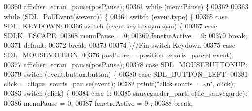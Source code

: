 \begin{DoxyCode}
00360                         afficher\_ecran\_pause(posPause);
00361                         \textcolor{keywordflow}{while} (menuPause) \{
00362 
00363                                 \textcolor{keywordflow}{while} (SDL\_PollEvent(&event)) \{
00364                                         \textcolor{keywordflow}{switch} (event.type) \{
00365                                         \textcolor{keywordflow}{case} SDL\_KEYDOWN:
00366                                                 \textcolor{keywordflow}{switch} (event.key.keysym.sym) \{
00367                                                 \textcolor{keywordflow}{case} SDLK\_ESCAPE:
00368                                                         menuPause = 0;
00369                                                         fenetreActive = 9;
00370                                                         \textcolor{keywordflow}{break};
00371                                                 \textcolor{keywordflow}{default}:
00372                                                         \textcolor{keywordflow}{break};
00373 
00374                                                 \}\textcolor{comment}{//Fin switch Keydown}
00375                                         \textcolor{keywordflow}{case} SDL\_MOUSEMOTION:
00376                                                 posPause = position\_souris\_pause(
      event);
00377                                                 afficher\_ecran\_pause(posPause);
00378                                         \textcolor{keywordflow}{case} SDL\_MOUSEBUTTONUP:
00379                                                 \textcolor{keywordflow}{switch} (event.button.button) \{
00380                                                 \textcolor{keywordflow}{case} SDL\_BUTTON\_LEFT:
00381                                                         click = clique\_souris\_pau
      se(event);
00382                                                         printf(\textcolor{stringliteral}{"click souris = %
       \(\backslash\)n"}, click);
00383                                                         \textcolor{keywordflow}{switch} (click) \{
00384                                                         \textcolor{keywordflow}{case} 1:
00385                                                                 sauvegarder\_parti
      e(fic\_sauvegarde);
00386                                                                 menuPause = 0;
00387                                                                 fenetreActive = 9
      ;
00388                                                                 \textcolor{keywordflow}{break};

\end{DoxyCode}
